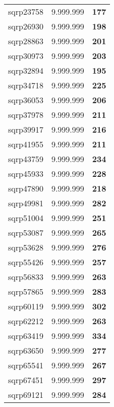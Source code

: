 \begin{tabular}{cc||c}
sqrp23758        & 9.999.999        & {\bf 177}       \\ 
sqrp26930        & 9.999.999        & {\bf 198}       \\ 
sqrp28863        & 9.999.999        & {\bf 201}       \\ 
sqrp30973        & 9.999.999        & {\bf 203}       \\ 
sqrp32894        & 9.999.999        & {\bf 195}       \\ 
sqrp34718        & 9.999.999        & {\bf 225}       \\ 
sqrp36053        & 9.999.999        & {\bf 206}       \\ 
sqrp37978        & 9.999.999        & {\bf 211}       \\ 
sqrp39917        & 9.999.999        & {\bf 216}       \\ 
sqrp41955        & 9.999.999        & {\bf 211}       \\ 
sqrp43759        & 9.999.999        & {\bf 234}       \\ 
sqrp45933        & 9.999.999        & {\bf 228}       \\ 
sqrp47890        & 9.999.999        & {\bf 218}       \\ 
sqrp49981        & 9.999.999        & {\bf 282}       \\ 
sqrp51004        & 9.999.999        & {\bf 251}       \\ 
sqrp53087        & 9.999.999        & {\bf 265}       \\ 
sqrp53628        & 9.999.999        & {\bf 276}       \\ 
sqrp55426        & 9.999.999        & {\bf 257}       \\ 
sqrp56833        & 9.999.999        & {\bf 263}       \\ 
sqrp57865        & 9.999.999        & {\bf 283}       \\ 
sqrp60119        & 9.999.999        & {\bf 302}       \\ 
sqrp62212        & 9.999.999        & {\bf 263}       \\ 
sqrp63419        & 9.999.999        & {\bf 334}       \\ 
sqrp63650        & 9.999.999        & {\bf 277}       \\ 
sqrp65541        & 9.999.999        & {\bf 267}       \\ 
sqrp67451        & 9.999.999        & {\bf 297}       \\ 
sqrp69121        & 9.999.999        & {\bf 284}       \\ 

\end{tabular}
